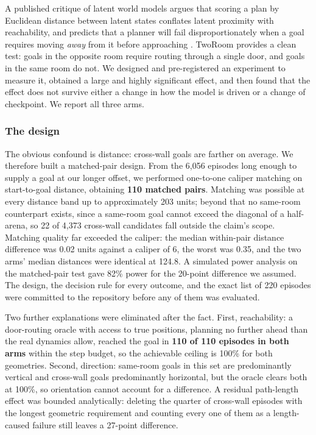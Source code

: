 \documentclass[10pt]{article}
\begin{document}
A published critique of latent world models argues that scoring a plan by
Euclidean distance between latent states conflates latent proximity with
reachability, and predicts that a planner will fail disproportionately when a
goal requires moving \emph{away} from it before approaching \citep{li2026beyond}. TwoRoom
provides a clean test: goals in the opposite room require routing through a
single door, and goals in the same room do not. We designed and pre-registered
an experiment to measure it, obtained a large and highly significant effect, and
then found that the effect does not survive either a change in how the model is
driven or a change of checkpoint. We report all three arms.

\subsubsection{The design}\label{the-design}

The obvious confound is distance: cross-wall goals are farther on average. We
therefore built a matched-pair design. From the 6,056 episodes long enough to
supply a goal at our longer offset, we performed one-to-one caliper matching on
start-to-goal distance, obtaining \textbf{110 matched pairs}. Matching was possible at every distance band
up to approximately 203 units; beyond that no same-room counterpart exists,
since a same-room goal cannot exceed the diagonal of a half-arena, so 22 of
4,373 cross-wall candidates fall outside the claim's scope. Matching quality far
exceeded the caliper: the median within-pair distance difference was 0.02 units
against a caliper of 6, the worst was 0.35, and the two arms' median distances
were identical at 124.8. A simulated power analysis on the matched-pair test
gave 82\% power for the 20-point difference we assumed. The design, the decision
rule for every outcome, and the exact list of 220 episodes were committed to the
repository before any of them was evaluated.

Two further explanations were eliminated after the fact. First, reachability: a
door-routing oracle with access to true positions, planning no further ahead
than the real dynamics allow, reached the goal in \textbf{110 of 110 episodes in both
arms} within the step budget, so the achievable ceiling is 100\% for both
geometries. Second, direction: same-room goals in this set are predominantly
vertical and cross-wall goals predominantly horizontal, but the oracle clears
both at 100\%, so orientation cannot account for a difference. A residual
path-length effect was bounded analytically: deleting the quarter of cross-wall
episodes with the longest geometric requirement and counting every one of them
as a length-caused failure still leaves a 27-point difference.
\end{document}
